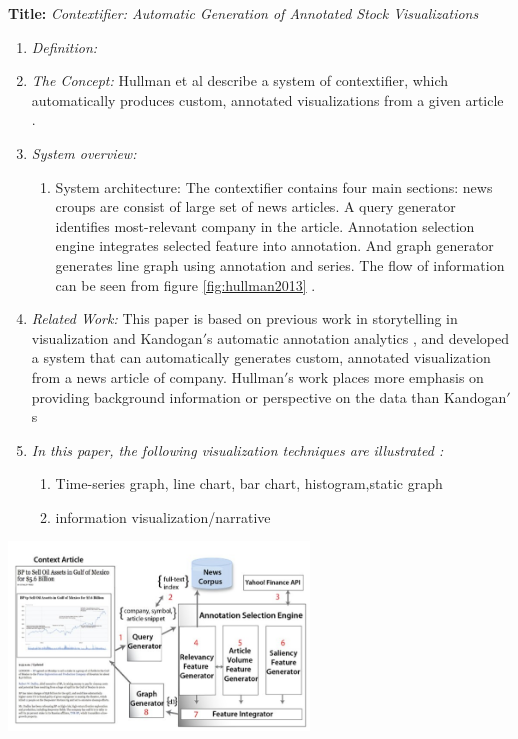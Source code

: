 \documentclass{egpubl}
\begin{document}
\textbf{Title:} \textit{Contextifier: Automatic Generation of Annotated Stock Visualizations}
\begin{enumerate}
\item \textit{Definition:} 
\item \textit{The Concept:} Hullman et al describe a system of contextifier, which automatically produces custom, annotated visualizations from a given article \cite{hullman2013}. 
\item \textit{System overview:}
\begin{enumerate}
\item System architecture: The contextifier contains four main sections: news croups are consist of large set of news articles. A query generator identifies most-relevant company in the article. Annotation selection engine integrates selected feature into annotation. And graph generator generates line graph using annotation and series. The flow of information can be seen from figure \ref{fig:hullman2013} \cite{hullman2013}.
\end{enumerate}
\item \textit{Related Work:} This paper is based on previous work in storytelling in visualization \cite{segal} and Kandogan$'$s automatic annotation analytics \cite{kandogan2012}, and developed a system that can automatically generates custom, annotated visualization from a news article of company. Hullman$'$s work places more emphasis on providing background information or perspective on the data than Kandogan$'$s \cite{kandogan2012}
\item \textit{In this paper, the following visualization techniques are illustrated :} 
\begin{enumerate}
\item Time-series graph, line chart, bar chart, histogram,static graph
\item information visualization/narrative
\end{enumerate}
\end{enumerate}

\begingroup
\centering
\includegraphics[width=8cm]{./images/hullman2013}
\label{fig:hullman2013}
\endgroup
\end{document}
